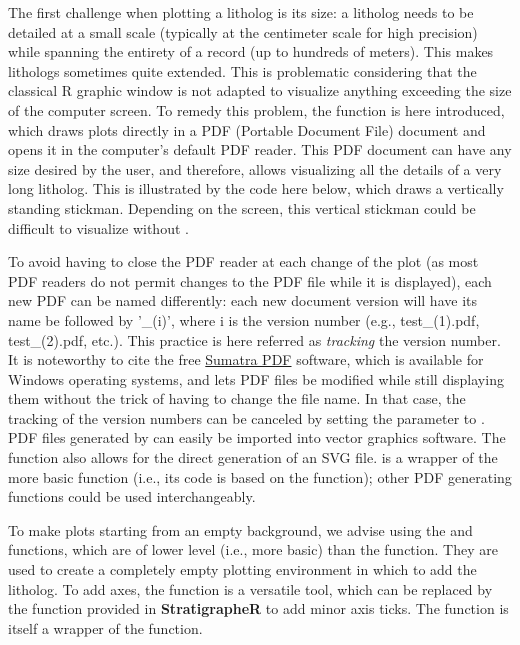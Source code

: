 The first challenge when plotting a litholog is its size: a litholog needs to be detailed at a small scale (typically at the centimeter scale for high precision) while spanning the entirety of a record (up to hundreds of meters). This makes lithologs sometimes quite extended. This is problematic considering that the classical R graphic window is not adapted to visualize anything exceeding the size of the computer screen. To remedy this problem, the  function is here introduced, which draws plots directly in a PDF (Portable Document File) document and opens it in the computer’s default PDF reader. This PDF document can have any size desired by the user, and therefore, allows visualizing all the details of a very long litholog. This is illustrated by the code here below, which draws a vertically standing stickman. Depending on the screen, this vertical stickman could be difficult to visualize without .

To avoid having to close the PDF reader at each change of the plot (as most PDF readers do not permit changes to the PDF file while it is displayed), each new PDF can be named differently: each new document version will have its name be followed by '\_(i)', where i is the version number (e.g., test\_(1).pdf, test\_(2).pdf, etc.). This practice is here referred as \emph{tracking} the version number. It is noteworthy to cite the free \href{https://www.sumatrapdfreader.org/free-pdf-reader.html}{Sumatra PDF} software, which is available for Windows operating systems, and lets PDF files be modified while still displaying them without the trick of having to change the file name. In that case, the tracking of the version numbers can be canceled by setting the  parameter to . PDF files generated by  can easily be imported into vector graphics software. The  function also allows for the direct generation of an SVG file.  is a wrapper of the more basic  function (i.e., its code is based on the  function); other PDF generating functions could be used interchangeably.

To make plots starting from an empty background, we advise using the  and  functions, which are of lower level (i.e., more basic) than the  function. They are used to create a completely empty plotting environment in which to add the litholog. To add axes, the  function is a versatile tool, which can be replaced by the  function provided in \textbf{StratigrapheR} to add minor axis ticks. The  function is itself a wrapper of the  function.

